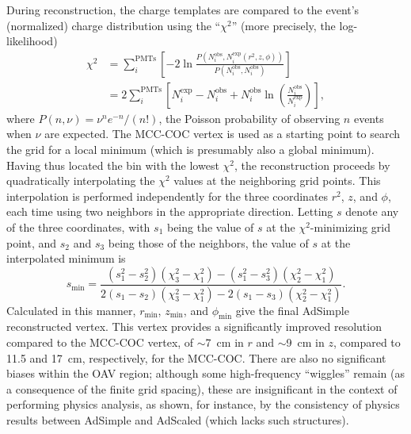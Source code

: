 \documentclass[../thesis.tex]{subfiles}
\begin{document}
\newcommand\Niobs{N_i^{\mathrm{obs}}} \newcommand\Niexp{N_i^{\mathrm{exp}}}

During reconstruction, the charge templates are compared to the event's
(normalized) charge distribution using the ``$\chi^2$'' (more precisely, the
log-likelihood)
\begin{align*}
  \chi^2 &= \sum_i^{\mathrm{PMTs}}\left[ -2 \ln \frac{P(\Niobs, \Niexp(r^2, z, \phi))}
           {P(\Niobs, \Niobs)} \right] \\
         &= 2 \sum_i^{\mathrm{PMTs}} \left[ \Niexp - \Niobs+ \Niobs \ln \left( \frac{\Niobs}{\Niexp} \right) \right],
\end{align*}
where $P(n, \nu) = \nu^n e^{-n} / (n!)$, the Poisson probability of observing
$n$ events when $\nu$ are expected. The MCC-COC vertex is used as a starting
point to search the grid for a local minimum (which is presumably also a global
minimum). Having thus located the bin with the lowest $\chi^2$, the
reconstruction proceeds by quadratically interpolating the $\chi^2$ values at
the neighboring grid points. This interpolation is performed independently for
the three coordinates $r^2$, $z$, and $\phi$, each time using two neighbors in
the appropriate direction. Letting $s$ denote any of the three coordinates, with
$s_1$ being the value of $s$ at the $\chi^2$-minimizing grid point, and $s_2$
and $s_3$ being those of the neighbors, the value of $s$ at the interpolated
minimum is
\begin{equation*}
  s_{\mathrm{min}} = \frac{(s_1^2 - s_2^2)(\chi_3^2 - \chi_1^2) - (s_1^2 - s_3^2)(\chi_2^2 - \chi_1^2)}{2(s_1 - s_2)(\chi_3^2 - \chi_1^2) - 2(s_1 - s_3)(\chi_2^2 - \chi_1^2)}.
\end{equation*}
Calculated in this manner, $r_{\mathrm{min}}$, $z_{\mathrm{min}}$, and
$\phi_{\mathrm{min}}$ give the final AdSimple reconstructed vertex. This vertex
provides a significantly improved resolution compared to the MCC-COC vertex, of
$\sim$7~cm in $r$ and $\sim$9~cm in $z$, compared to 11.5 and 17~cm,
respectively, for the MCC-COC. There are also no significant biases within the
OAV region; although some high-frequency ``wiggles'' remain (as a consequence of
the finite grid spacing), these are insignificant in the context of performing
physics analysis, as shown, for instance, by the consistency of physics results
between AdSimple and AdScaled (which lacks such structures).
\end{document}
